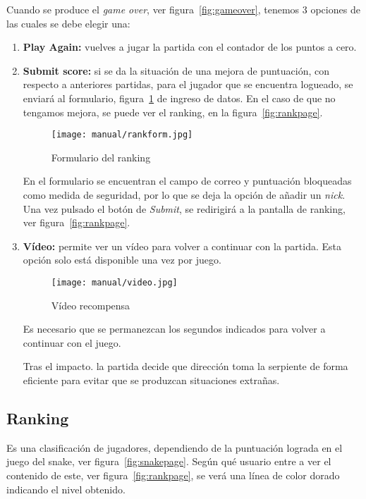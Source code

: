 Cuando se produce el \emph{game over}, ver figura~\ref{fig:gameover}, tenemos 3 opciones de las cuales se debe elegir una:

\begin{enumerate}
	\item \textbf{Play Again:} vuelves a jugar la partida con el contador de los puntos a cero.
	\item \textbf{Submit score:} si se da la situación de una mejora de puntuación, con respecto a anteriores partidas, para el jugador que se encuentra logueado, se enviará al formulario, figura~\ref{fig:rankform} de ingreso de datos.
	En el caso de que no tengamos mejora, se puede ver el ranking, en la figura~\ref{fig:rankpage}.
	
	\begin{figure}%
		\centering
		\texttt{[image: manual/rankform.jpg]}
		\caption{Formulario del ranking}\label{fig:rankform}
	\end{figure}
	
	En el formulario se encuentran el campo de correo y puntuación bloqueadas como medida de seguridad, por lo que se deja la opción de añadir un \emph{nick}. Una vez pulsado el botón de \emph{Submit}, se redirigirá a la pantalla de ranking, ver figura~\ref{fig:rankpage}.
	
	\item \textbf{Vídeo:} permite ver un vídeo para volver a continuar con la partida. Esta opción solo está disponible una vez por juego.
	
		\begin{figure}%
		\centering
		\texttt{[image: manual/video.jpg]}
		\caption{Vídeo recompensa}\label{fig:video}
		\end{figure}
	
	Es necesario que se permanezcan los segundos indicados para volver a continuar con el juego. 
	
	Tras el impacto. la partida decide que dirección toma la serpiente de forma eficiente para evitar que se produzcan situaciones extrañas.
		
\end{enumerate}

\subsection{Ranking}\label{rank}
Es una clasificación de jugadores, dependiendo de la puntuación lograda en el juego del snake, ver figura~\ref{fig:snakepage}. Según qué usuario entre a ver el contenido de este, ver figura~\ref{fig:rankpage}, se verá una línea de color dorado indicando el nivel obtenido.

